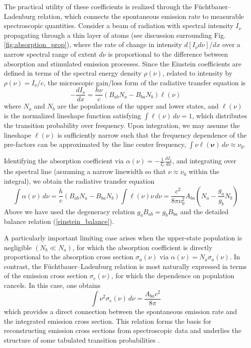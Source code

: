 \documentclass[8pt,a4paper]{report}
\begin{document}
	The practical utility of these coefficients is realized through the Füchtbauer–Ladenburg relation, which connects the spontaneous emission rate to measurable spectroscopic quantities. Consider a beam of radiation with spectral intensity $I_\nu$ propagating through a thin layer of atoms (see discussion surrounding Fig. \ref{fig:absorption_prop}), where the rate of change in intensity $d\left[I_{\nu}d\nu\right] / dx$ over a narrow spectral range of extent $d\nu$ is proportional to the difference between absorption and stimulated emission processes. Since the Einstein coefficients are defined in terms of the spectral energy density $\rho(\nu)$, related to intensity by $\rho(\nu) = I_\nu / c$, the microscopic gain/loss form of the radiative transfer equation is
	\begin{equation}
		-\frac{d I_\nu}{dx} = \frac{h\nu}{c} \left( B_{ab} N_a - B_{ba} N_b \right) \ell(\nu)
	\end{equation}	
	where $N_a$ and $N_b$ are the populations of the upper and lower states, and $\ell(\nu)$ is the normalized lineshape function satisfying $\int \ell(\nu) \, d\nu = 1$, which distributes the transition probability over frequency. Upon integration, we may assume the lineshape $\ell(\nu)$ is sufficiently narrow such that the frequency dependence of the pre-factors can be approximated by the line center frequency, $\int \nu \ell(\mathbf{\nu}) \, d\nu \approx \nu_0$.
	
	Identifying the absorption coefficient via $\alpha(\nu) = -\frac{1}{I_\nu}\frac{dI_\nu}{dx}$, and integrating over the spectral line (asuuming a narrow linewidth so that $\nu \approx \nu_0$ within the integral), we obtain the radiative transfer equation
	\begin{equation}
		\int \alpha(\nu)\,d\nu
		= \frac{h}{c} \left( B_{ab} N_a - B_{ba} N_b \right) \int \ell(\nu) \nu \, d\nu
		= \frac{c^2}{8\pi \nu_0^2} A_{ba} \left( N_a - \frac{g_a}{g_b} N_b \right)
	\end{equation}
	Above we have used the degeneracy relation $g_a B_{ab} = g_b B_{ba}$ and the detailed balance relation (\ref{einstein_balance}).
	
	A particularly important limiting case arises when the upper-state population is negligible $(N_b \ll N_a)$, for which the absorption coefficient is directly proportional to the absorption cross section $\sigma_a(\nu)$ via $\alpha(\nu) = N_a \sigma_a(\nu)$. In contrast, the Füchtbauer–Ladenburg relation is most naturally expressed in terms of the emission cross section $\sigma_e(\nu)$, for which the dependence on population cancels. In this case, one obtains
	\begin{equation}
		\int \nu^2 \sigma_e(\nu)\, d\nu = \frac{A_{ba} c^2}{8\pi}
	\end{equation}
	which provides a direct connection between the spontaneous emission rate and the integrated emission cross section. This relation forms the basis for reconstructing emission cross sections from spectroscopic data and underlies the structure of some tabulated transition probabilities \cite{lineshapes_fuchtbauer_laden}.
	
\end{document}
